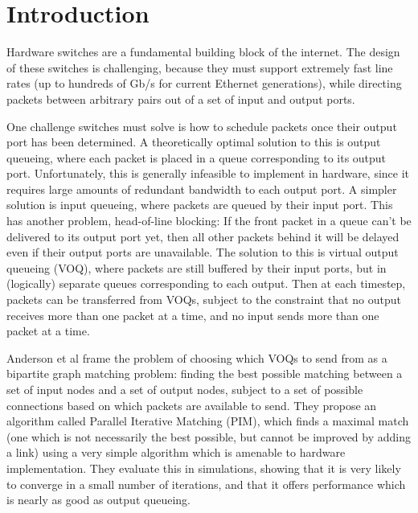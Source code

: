 \section{Introduction}
Hardware switches are a fundamental building block of the internet. The design of these switches is challenging, because they must support extremely fast line rates (up to hundreds of Gb/s for current Ethernet generations), while directing packets between arbitrary pairs out of a set of input and output ports.

One challenge switches must solve is how to schedule packets once their output port has been determined. A theoretically optimal solution to this is output queueing, where each packet is placed in a queue corresponding to its output port. Unfortunately, this is generally infeasible to implement in hardware, since it requires large amounts of redundant bandwidth to each output port. A simpler solution is input queueing, where packets are queued by their input port. This has another problem, head-of-line blocking: If the front packet in a queue can't be delivered to its output port yet, then all other packets behind it will be delayed even if their output ports are unavailable. The solution to this is virtual output queueing (VOQ), where packets are still buffered by their input ports, but in (logically) separate queues corresponding to each output. Then at each timestep, packets can be transferred from VOQs, subject to the constraint that no output receives more than one packet at a time, and no input sends more than one packet at a time.

Anderson et al \cite{anderson} frame the problem of choosing which VOQs to send from as a bipartite graph matching problem: finding the best possible matching between a set of input nodes and a set of output nodes, subject to a set of possible connections based on which packets are available to send. They propose an algorithm called Parallel Iterative Matching (PIM), which finds a maximal match (one which is not necessarily the best possible, but cannot be improved by adding a link) using a very simple algorithm which is amenable to hardware implementation. They evaluate this in simulations, showing that it is very likely to converge in a small number of iterations, and that it offers performance which is nearly as good as output queueing.

